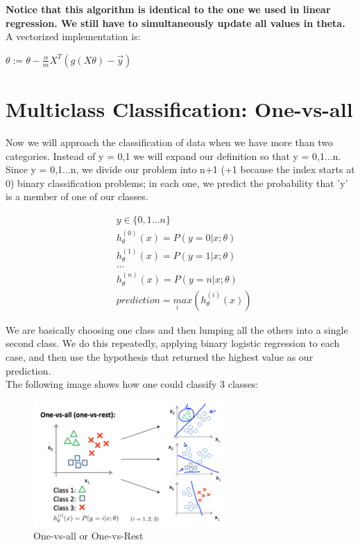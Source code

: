 \textbf{Notice that this algorithm is identical to the one we used in linear regression. We still have to simultaneously update all values in theta.}\\

A vectorized implementation is:\\

\begin{center}
$\theta:=\theta- \frac{\alpha}{m} X^T \left(g(X\theta)- \overrightarrow{y}\right)$
\end{center}

\section{Multiclass Classification: One-vs-all}

Now we will approach the classification of data when we have more than two categories. Instead of y = {0,1} we will expand our definition so that y = {0,1...n}.\\

Since y = {0,1...n}, we divide our problem into n+1 (+1 because the index starts at 0) binary classification problems; in each one, we predict the probability that 'y' is a member of one of our classes.\\

\begin{tcolorbox}[width=\textwidth,colback={white},colbacktitle=white]
	\begin{align*}
	&y \in \{0,1 \dots n\}\\
	&h^{(0)}_\theta(x)=P(y=0|x;\theta)\\
	&h^{(1)}_\theta(x)=P(y=1|x;\theta)\\
	&\dots\\
	&h^{(n)}_\theta(x)=P(y=n|x;\theta)\\
	&prediction = \underset{i}max(h^{(i)}_\theta(x))
	\end{align*}
\end{tcolorbox} 

We are basically choosing one class and then lumping all the others into a single second class. We do this repeatedly, applying binary logistic regression to each case, and then use the hypothesis that returned the highest value as our prediction.\\

The following image shows how one could classify 3 classes:\\

\begin{figure}[h!]
	\centering
	\includegraphics[width=0.65\textwidth]{fig/onvsall}
	\caption{One-vs-all or One-vs-Rest}
\end{figure}